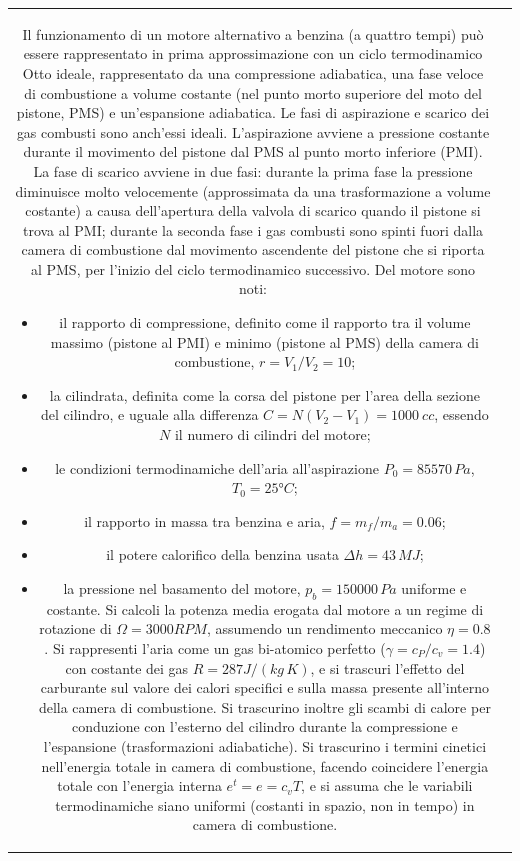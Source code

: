 \noindent
\begin{tabular}{cc}
\begin{minipage}{0.95\textwidth}
\begin{exerciseS}
Il funzionamento di un motore alternativo a benzina (a quattro tempi) può essere rappresentato in prima approssimazione con un ciclo termodinamico Otto ideale, rappresentato da una compressione adiabatica, una fase veloce di combustione a volume costante (nel punto morto superiore del moto del pistone, PMS) e un'espansione adiabatica. Le fasi di aspirazione e scarico dei gas combusti sono anch'essi ideali. L'aspirazione avviene a pressione costante durante il movimento del pistone dal PMS al punto morto inferiore (PMI). La fase di scarico avviene in due fasi: durante la prima fase la pressione diminuisce molto velocemente (approssimata da una trasformazione a volume costante) a causa dell'apertura della valvola di scarico quando il pistone si trova al PMI; durante la seconda fase i gas combusti sono spinti fuori dalla camera di combustione dal movimento ascendente del pistone che si riporta al PMS, per l'inizio del ciclo termodinamico successivo. Del motore sono noti:
\begin{itemize}
 \item il rapporto di compressione, definito come il rapporto tra il volume massimo (pistone al PMI) e minimo (pistone al PMS) della camera di combustione, $r = V_1 / V_2 = 10$;
 \item la cilindrata, definita come la corsa del pistone per l'area della sezione del cilindro, e uguale alla differenza $C = N (V_2 - V_1) = 1000 \ cc$, essendo $N$ il numero di cilindri del motore;
 \item le condizioni termodinamiche dell'aria all'aspirazione $P_0 = 85570 \, Pa$, $T_0 = 25°C$;
 \item il rapporto in massa tra benzina e aria, $f = m_f / m_a = 0.06$;
 \item il potere calorifico della benzina usata $\Delta h = 43 \, MJ$;
 \item la pressione nel basamento del motore, $p_{b} = 150000 \, Pa$ uniforme e costante.
Si calcoli la potenza media erogata dal motore a un regime di rotazione di $\Omega = 3000 RPM$, assumendo un rendimento meccanico $\eta = 0.8$.
Si rappresenti l'aria come un gas bi-atomico perfetto ($\gamma = c_P/ c_v = 1.4$) con costante dei gas $R = 287 J / (kg \, K)$, e si trascuri l'effetto del carburante sul valore dei calori specifici e sulla massa presente all'interno della camera di combustione. Si trascurino inoltre gli scambi di calore per conduzione con l'esterno del cilindro durante la compressione e l'espansione (trasformazioni adiabatiche). Si trascurino i termini cinetici nell'energia totale in camera di combustione, facendo coincidere l'energia totale con l'energia interna $e^t = e = c_v T$, e si assuma che le variabili termodinamiche siano uniformi (costanti in spazio, non in tempo) in camera di combustione.
\end{itemize}
\end{exerciseS}
\end{minipage}
\end{tabular}
